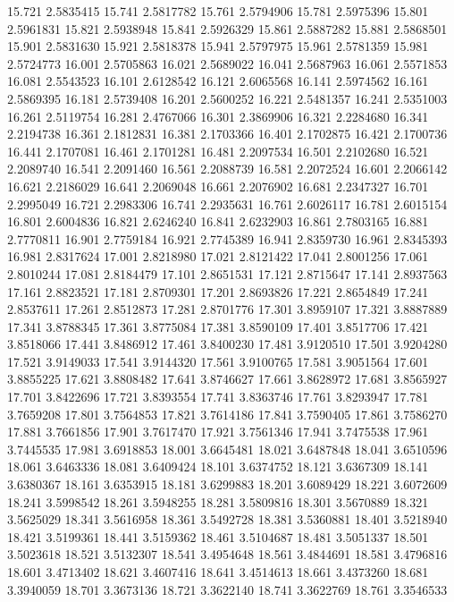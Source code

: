 15.721 2.5835415
15.741 2.5817782
15.761 2.5794906
15.781 2.5975396
15.801 2.5961831
15.821 2.5938948
15.841 2.5926329
15.861 2.5887282
15.881 2.5868501
15.901 2.5831630
15.921 2.5818378
15.941 2.5797975
15.961 2.5781359
15.981 2.5724773
16.001 2.5705863
16.021 2.5689022
16.041 2.5687963
16.061 2.5571853
16.081 2.5543523
16.101 2.6128542
16.121 2.6065568
16.141 2.5974562
16.161 2.5869395
16.181 2.5739408
16.201 2.5600252
16.221 2.5481357
16.241 2.5351003
16.261 2.5119754
16.281 2.4767066
16.301 2.3869906
16.321 2.2284680
16.341 2.2194738
16.361 2.1812831
16.381 2.1703366
16.401 2.1702875
16.421 2.1700736
16.441 2.1707081
16.461 2.1701281
16.481 2.2097534
16.501 2.2102680
16.521 2.2089740
16.541 2.2091460
16.561 2.2088739
16.581 2.2072524
16.601 2.2066142
16.621 2.2186029
16.641 2.2069048
16.661 2.2076902
16.681 2.2347327
16.701 2.2995049
16.721 2.2983306
16.741 2.2935631
16.761 2.6026117
16.781 2.6015154
16.801 2.6004836
16.821 2.6246240
16.841 2.6232903
16.861 2.7803165
16.881 2.7770811
16.901 2.7759184
16.921 2.7745389
16.941 2.8359730
16.961 2.8345393
16.981 2.8317624
17.001 2.8218980
17.021 2.8121422
17.041 2.8001256
17.061 2.8010244
17.081 2.8184479
17.101 2.8651531
17.121 2.8715647
17.141 2.8937563
17.161 2.8823521
17.181 2.8709301
17.201 2.8693826
17.221 2.8654849
17.241 2.8537611
17.261 2.8512873
17.281 2.8701776
17.301 3.8959107
17.321 3.8887889
17.341 3.8788345
17.361 3.8775084
17.381 3.8590109
17.401 3.8517706
17.421 3.8518066
17.441 3.8486912
17.461 3.8400230
17.481 3.9120510
17.501 3.9204280
17.521 3.9149033
17.541 3.9144320
17.561 3.9100765
17.581 3.9051564
17.601 3.8855225
17.621 3.8808482
17.641 3.8746627
17.661 3.8628972
17.681 3.8565927
17.701 3.8422696
17.721 3.8393554
17.741 3.8363746
17.761 3.8293947
17.781 3.7659208
17.801 3.7564853
17.821 3.7614186
17.841 3.7590405
17.861 3.7586270
17.881 3.7661856
17.901 3.7617470
17.921 3.7561346
17.941 3.7475538
17.961 3.7445535
17.981 3.6918853
18.001 3.6645481
18.021 3.6487848
18.041 3.6510596
18.061 3.6463336
18.081 3.6409424
18.101 3.6374752
18.121 3.6367309
18.141 3.6380367
18.161 3.6353915
18.181 3.6299883
18.201 3.6089429
18.221 3.6072609
18.241 3.5998542
18.261 3.5948255
18.281 3.5809816
18.301 3.5670889
18.321 3.5625029
18.341 3.5616958
18.361 3.5492728
18.381 3.5360881
18.401 3.5218940
18.421 3.5199361
18.441 3.5159362
18.461 3.5104687
18.481 3.5051337
18.501 3.5023618
18.521 3.5132307
18.541 3.4954648
18.561 3.4844691
18.581 3.4796816
18.601 3.4713402
18.621 3.4607416
18.641 3.4514613
18.661 3.4373260
18.681 3.3940059
18.701 3.3673136
18.721 3.3622140
18.741 3.3622769
18.761 3.3546533
